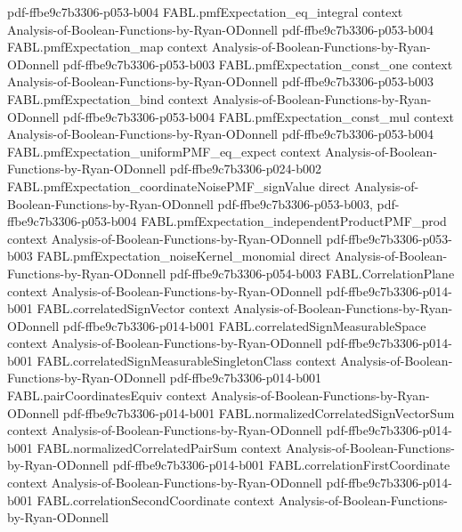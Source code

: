 \begin{theorem}
  {pdf-ffbe9c7b3306-p053-b004}
\proofstep
  {FABL.pmfExpectation_eq_integral}
  {context}
  {Analysis-of-Boolean-Functions-by-Ryan-ODonnell}
  {pdf-ffbe9c7b3306-p053-b004}
\proofstep
  {FABL.pmfExpectation_map}
  {context}
  {Analysis-of-Boolean-Functions-by-Ryan-ODonnell}
  {pdf-ffbe9c7b3306-p053-b003}
\proofstep
  {FABL.pmfExpectation_const_one}
  {context}
  {Analysis-of-Boolean-Functions-by-Ryan-ODonnell}
  {pdf-ffbe9c7b3306-p053-b003}
\proofstep
  {FABL.pmfExpectation_bind}
  {context}
  {Analysis-of-Boolean-Functions-by-Ryan-ODonnell}
  {pdf-ffbe9c7b3306-p053-b004}
\proofstep
  {FABL.pmfExpectation_const_mul}
  {context}
  {Analysis-of-Boolean-Functions-by-Ryan-ODonnell}
  {pdf-ffbe9c7b3306-p053-b004}
\proofstep
  {FABL.pmfExpectation_uniformPMF_eq_expect}
  {context}
  {Analysis-of-Boolean-Functions-by-Ryan-ODonnell}
  {pdf-ffbe9c7b3306-p024-b002}
\proofstep
  {FABL.pmfExpectation_coordinateNoisePMF_signValue}
  {direct}
  {Analysis-of-Boolean-Functions-by-Ryan-ODonnell}
  {pdf-ffbe9c7b3306-p053-b003,
    pdf-ffbe9c7b3306-p053-b004}
\proofstep
  {FABL.pmfExpectation_independentProductPMF_prod}
  {context}
  {Analysis-of-Boolean-Functions-by-Ryan-ODonnell}
  {pdf-ffbe9c7b3306-p053-b003}
\proofstep
  {FABL.pmfExpectation_noiseKernel_monomial}
  {direct}
  {Analysis-of-Boolean-Functions-by-Ryan-ODonnell}
  {pdf-ffbe9c7b3306-p054-b003}
\proofstep
  {FABL.CorrelationPlane}
  {context}
  {Analysis-of-Boolean-Functions-by-Ryan-ODonnell}
  {pdf-ffbe9c7b3306-p014-b001}
\proofstep
  {FABL.correlatedSignVector}
  {context}
  {Analysis-of-Boolean-Functions-by-Ryan-ODonnell}
  {pdf-ffbe9c7b3306-p014-b001}
\proofstep
  {FABL.correlatedSignMeasurableSpace}
  {context}
  {Analysis-of-Boolean-Functions-by-Ryan-ODonnell}
  {pdf-ffbe9c7b3306-p014-b001}
\proofstep
  {FABL.correlatedSignMeasurableSingletonClass}
  {context}
  {Analysis-of-Boolean-Functions-by-Ryan-ODonnell}
  {pdf-ffbe9c7b3306-p014-b001}
\proofstep
  {FABL.pairCoordinatesEquiv}
  {context}
  {Analysis-of-Boolean-Functions-by-Ryan-ODonnell}
  {pdf-ffbe9c7b3306-p014-b001}
\proofstep
  {FABL.normalizedCorrelatedSignVectorSum}
  {context}
  {Analysis-of-Boolean-Functions-by-Ryan-ODonnell}
  {pdf-ffbe9c7b3306-p014-b001}
\proofstep
  {FABL.normalizedCorrelatedPairSum}
  {context}
  {Analysis-of-Boolean-Functions-by-Ryan-ODonnell}
  {pdf-ffbe9c7b3306-p014-b001}
\proofstep
  {FABL.correlationFirstCoordinate}
  {context}
  {Analysis-of-Boolean-Functions-by-Ryan-ODonnell}
  {pdf-ffbe9c7b3306-p014-b001}
\proofstep
  {FABL.correlationSecondCoordinate}
  {context}
  {Analysis-of-Boolean-Functions-by-Ryan-ODonnell}

\end{theorem}
